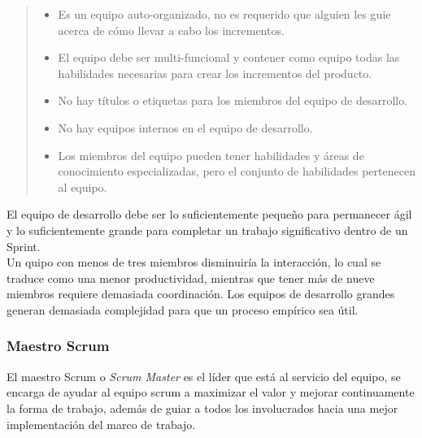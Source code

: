     \begin{quote}
    \begin{itemize}
        \item Es un equipo auto-organizado, no es requerido que alguien les guie
              acerca de cómo llevar a cabo los incrementos.

        \item El equipo debe ser multi-funcional y contener como equipo todas las
              habilidades necesarias para crear los incrementos del producto.

        \item No hay títulos o etiquetas para los miembros del equipo de desarrollo.

        \item No hay equipos internos en el equipo de desarrollo.

        \item Los miembros del equipo pueden tener habilidades y áreas de conocimiento
              especializadas, pero el conjunto de habilidades pertenecen al equipo.
    \end{itemize}
    \end{quote}
        
 \noindent El equipo de desarrollo debe ser lo suficientemente pequeño para permanecer ágil y lo
 suficientemente grande para completar un trabajo significativo dentro de un Sprint.\\
        
 \noindent Un quipo con menos de tres miembros disminuiría la interacción, lo cual se traduce
 como una menor productividad, mientras que tener más de nueve miembros requiere demasiada
 coordinación. Los equipos de desarrollo grandes generan demasiada complejidad para que un
 proceso empírico sea útil.

\clearpage

\subsubsection{Maestro Scrum}

 El maestro Scrum o {\it Scrum Master} es el líder que está al servicio del equipo,
 se encarga de ayudar al equipo scrum a maximizar el valor y mejorar continuamente la
 forma de trabajo, además de guiar a todos los involucrados hacia una mejor implementación
 del marco de trabajo.

